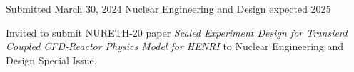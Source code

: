 

    \cventry
    {Submitted March 30, 2024} %
    {Nuclear Engineering and Design} %
    {} %
    {expected 2025} %
    {
    \begin{cvitems}
        \item{Invited to submit NURETH-20 paper \textit{Scaled Experiment Design for Transient Coupled CFD-Reactor Physics Model for HENRI} to Nuclear Engineering and Design Special Issue.}
    \end{cvitems}
    }



